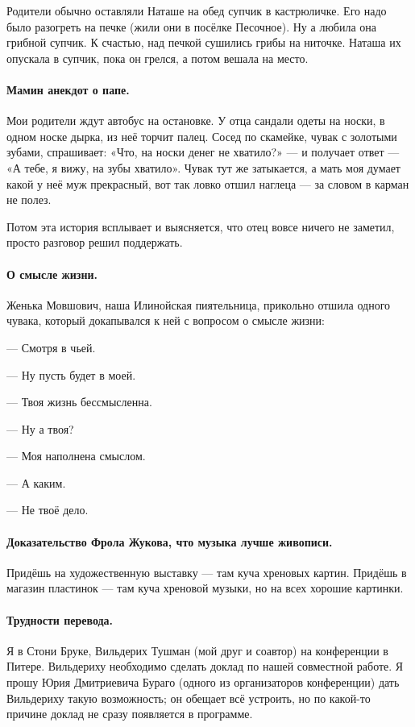 \documentclass{book}
\begin{document}
Родители обычно оставляли Наташе на обед супчик в кастрюличке.
Его надо было разогреть на печке (жили они в посёлке Песочное).
Ну а любила она грибной супчик.
К счастью, над печкой сушились грибы на ниточке.
Наташа их опускала в супчик, пока он грелся, а потом вешала на место.

\paragraph{Мамин анекдот о папе.}
Мои родители ждут автобус на остановке.
У отца сандали одеты на носки, в одном носке дырка, из неё торчит палец.
Сосед по скамейке, чувак с золотыми зубами, спрашивает: «Что, на носки денег не хватило?» --- и получает ответ --- «А тебе, я вижу, на зубы хватило».
Чувак тут же затыкается, а мать моя думает какой у неё муж прекрасный, вот так ловко отшил наглеца --- за словом в карман не полез.

Потом эта история всплывает и выясняется, что отец вовсе ничего не заметил, просто разговор решил поддержать.

\paragraph{О смысле жизни.}
Женька Мовшович, наша Илинойская пиятельница, прикольно отшила одного чувака, который докапывался к ней с вопросом о смысле жизни:

--- Смотря в чьей.

--- Ну пусть будет в моей.

--- Твоя жизнь бессмысленна.

--- Ну а твоя?

--- Моя наполнена смыслом.

--- А каким.

--- Не твоё дело.

\paragraph{Доказательство Фрола Жукова, что музыка лучше живописи.}
Придёшь на художественную выставку --- там куча хреновых картин.
Придёшь в магазин пластинок --- там куча хреновой музыки, но на всех хорошие картинки.

\paragraph{Трудности перевода.}
Я в Стони Бруке, Вильдерих Тушман (мой друг и соавтор) на конференции в Питере.
Вильдериху необходимо сделать доклад по нашей совместной работе.
Я прошу Юрия Дмитриевича Бураго (одного из организаторов конференции) дать Вильдериху такую возможность;
он обещает всё устроить, но по какой-то причине доклад не сразу появляется в программе.
\end{document}

